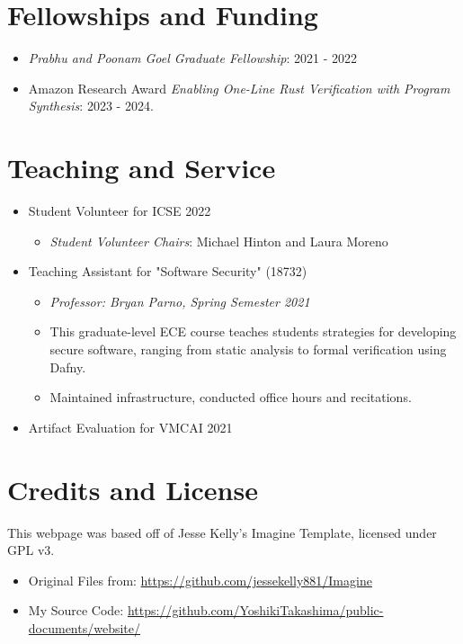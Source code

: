 \documentclass[11pt]{article}
\begin{document}
\section*{Fellowships and Funding}
\label{sec:org8957bb7}
\begin{itemize}
\item \emph{Prabhu and Poonam Goel Graduate Fellowship}: 2021 - 2022
\item Amazon Research Award \emph{Enabling One-Line Rust
Verification with Program Synthesis}: 2023 - 2024.
\end{itemize}
\section*{Teaching and Service}
\label{sec:orgb877f3a}
\begin{itemize}
\item Student Volunteer for ICSE 2022
\begin{itemize}
\item \emph{Student Volunteer Chairs}: Michael Hinton and Laura Moreno
\end{itemize}
\item Teaching Assistant for "Software Security" (18732)
\begin{itemize}
\item \emph{Professor: Bryan Parno, Spring Semester 2021}
\item This graduate-level ECE course teaches students strategies for
developing secure software, ranging from static analysis to
formal verification using Dafny.
\item Maintained infrastructure, conducted office hours and
recitations.
\end{itemize}
\item Artifact Evaluation for VMCAI 2021
\end{itemize}
\section*{Credits and License}
\label{sec:org8e531d2}
This webpage was based off of Jesse Kelly's Imagine Template,
licensed under GPL v3.
\begin{itemize}
\item Original Files from: \url{https://github.com/jessekelly881/Imagine}
\item My Source Code: \url{https://github.com/YoshikiTakashima/public-documents/website/}
\end{itemize}
\end{document}
